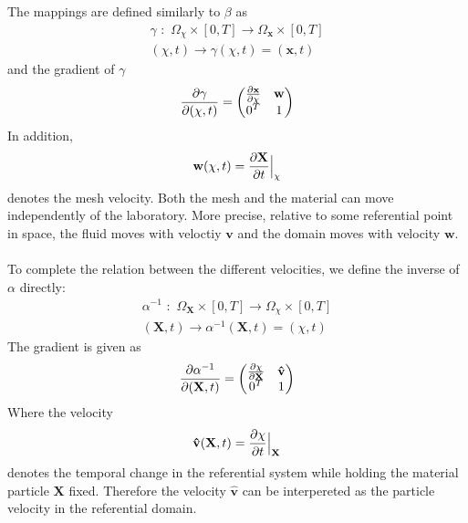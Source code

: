 The mappings are defined similarly to $\beta$ as
\begin{align}
\gamma \,\, : \,\, \Omega_{\chi} \times [0,T] \rightarrow  \Omega_{\mathbf{x}} \times [0,T] \\
(\chi,t) \rightarrow \gamma(\chi,t) = (\mathbf{x},t)
\end{align}
and the gradient of $\gamma$
\begin{align}
\frac{\partial \gamma}{\partial (\chi,t)} = \begin{pmatrix} \frac{\partial \mathbf{x}}{\partial \chi} & \mathbf{w} \\
											0^T & 1
								\end{pmatrix} \label{gammaGradient}
\end{align}
In addition, 
\begin{align} \mathbf{w}(\chi,t) = \frac{\partial \mathbf{X}}{\partial t}\Big{|}_{\chi} \label{MeshVel}
\end{align}
denotes the mesh velocity. Both the mesh and the material can move independently of the laboratory. More precise, relative to some referential point in space, the fluid moves with veloctiy $\mathbf{v}$ and the domain moves with velocity $\mathbf{w}$. 
\\
\\
To complete the relation between the different velocities, we define the inverse of $\alpha$ directly: 
\begin{align}
\alpha^{-1} \,\, : \,\, \Omega_{\mathbf{X}} \times [0,T] \rightarrow  \Omega_{\chi} \times [0,T] \\
(\mathbf{X},t) \rightarrow \alpha^{-1}(\mathbf{X},t) = (\chi,t)
\end{align}
The gradient is given as
\begin{align}
\frac{\partial \alpha^{-1}}{\partial (\mathbf{X},t)} = \begin{pmatrix} \frac{\partial \chi}{\partial \mathbf{X}} & \mathbf{\hat{v}} \\
											0^T & 1
								\end{pmatrix} \label{alpha_Gradient}
\end{align}
Where the velocity 
\begin{align} \mathbf{\hat{v}}(\mathbf{X},t) = \frac{\partial \chi}{\partial t}\Big{|}_{\mathbf{X}} \label{HatVel}
\end{align}
denotes the temporal change in the referential system while holding the material particle $\mathbf{X}$ fixed. Therefore the velocity $\mathbf{\hat{v}}$ can be interpereted as the particle velocity in the referential domain. \\
\\
